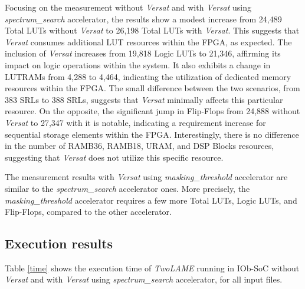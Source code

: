 Focusing on the measurement without \textit{Versat} and with \textit{Versat} using \textit{spectrum\_search} accelerator, the results show a modest increase from 24,489 Total LUTs without \textit{Versat} to 26,198 Total LUTs with \textit{Versat}. This suggests that \textit{Versat} consumes additional LUT resources within the FPGA, as expected.
The inclusion of \textit{Versat} increases from 19,818 Logic LUTs to 21,346, affirming its impact on logic operations within the system. It also exhibits a change in LUTRAMs from 4,288 to 4,464, indicating the utilization of dedicated memory resources within the FPGA.
The small difference between the two scenarios, from 383 SRLs to 388 SRLs, suggests that \textit{Versat} minimally affects this particular resource. On the opposite, the significant jump in Flip-Flops from 24,888 without \textit{Versat} to 27,347 with it is notable, indicating a requirement increase for sequential storage elements within the FPGA.
Interestingly, there is no difference in the number of RAMB36, RAMB18, URAM, and DSP Blocks resources, suggesting that \textit{Versat} does not utilize this specific resource.

The measurement results with \textit{Versat} using \textit{masking\_threshold} accelerator are similar to the \textit{spectrum\_search} accelerator ones. More precisely, the \textit{masking\_threshold} accelerator requires a few more Total LUTs, Logic LUTs, and Flip-Flops, compared to the other accelerator.


\subsection{Execution results}

Table \ref{time} shows the execution time of \textit{TwoLAME} running in IOb-SoC without \textit{Versat} and with \textit{Versat} using \textit{spectrum\_search} accelerator, for all input files.

\vspace{1cm}

